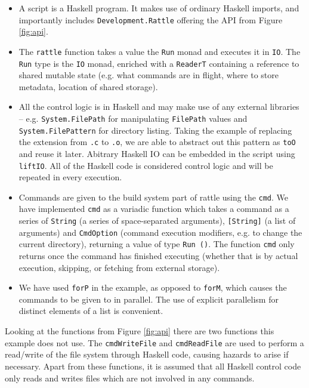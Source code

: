 \begin{itemize}
\item A \Rattle script is a Haskell program. It makes use of ordinary Haskell imports, and importantly includes \texttt{Development.Rattle} offering the API from Figure \ref{fig:api}.
\item The \texttt{rattle} function takes a value the \texttt{Run} monad and executes it in \texttt{IO}. The \texttt{Run} type is the \texttt{IO} monad, enriched with a \texttt{ReaderT} containing a reference to shared mutable state (e.g. what commands are in flight, where to store metadata, location of shared storage).
\item All the control logic is in Haskell and may make use of any external libraries -- e.g. \texttt{System.FilePath} for manipulating \texttt{FilePath} values and \texttt{System.FilePattern} for directory listing. Taking the example of replacing the extension from \texttt{.c} to \texttt{.o}, we are able to abstract out this pattern as \texttt{toO} and reuse it later. Abitrary Haskell IO can be embedded in the script using \texttt{liftIO}. All of the Haskell code is considered control logic and will be repeated in every execution.
\item Commands are given to the build system part of rattle using the \texttt{cmd}. We have implemented \texttt{cmd} as a variadic function \cite{variadic_functions} which takes a command as a series of \texttt{String} (a series of space-separated arguments), \texttt{[String]} (a list of arguments) and \texttt{CmdOption} (command execution modifiers, e.g. to change the current directory), returning a value of type \texttt{Run ()}. The function \texttt{cmd} only returns once the command has finished executing (whether that is by actual execution, skipping, or fetching from external storage).
\item We have used \texttt{forP} in the example, as opposed to \texttt{forM}, which causes the commands to be given to \Rattle in parallel. The use of explicit parallelism for distinct elements of a list is convenient.
\end{itemize}

Looking at the functions from Figure \ref{fig:api} there are two functions this example does not use. The \texttt{cmdWriteFile} and \texttt{cmdReadFile} are used to perform a read/write of the file system through Haskell code, causing hazards to arise if necessary. Apart from these functions, it is assumed that all Haskell control code only reads and writes files which are not involved in any commands.

